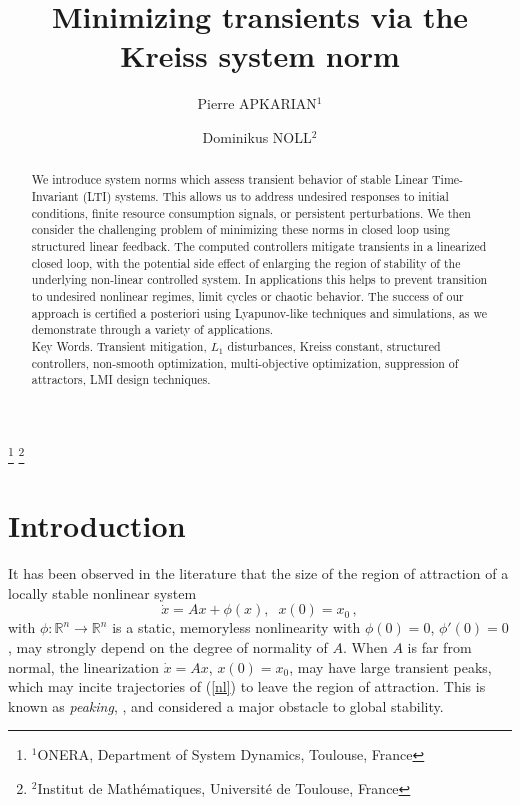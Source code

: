 \documentclass[12pt, a4paper,reqno]{amsart}
\theoremstyle{definition}
\begin{document}

\title[Kreiss system norm]{Minimizing transients via the Kreiss system  norm}
\author{Pierre APKARIAN$^1$}
\author{Dominikus NOLL$^{2}$}
\thanks{$^1$ONERA, Department of System Dynamics, Toulouse, France}
\thanks{$^2$Institut de Math\'ematiques, Universit\'e de Toulouse, France}



\begin{abstract}
We introduce system norms 
which assess transient behavior of stable Linear Time-Invariant (LTI) systems. 
This allows us to address undesired responses to initial conditions, finite resource consumption signals, or persistent perturbations.  
We then consider the challenging problem  of minimizing these norms in closed loop
using structured linear feedback. The computed controllers mitigate transients in a linearized
closed loop, with the potential side effect of enlarging the region of stability of the underlying 
non-linear controlled system. In applications this helps to
prevent transition to undesired nonlinear regimes, limit cycles or chaotic behavior. 
The success of our approach is certified a posteriori using Lyapunov-like techniques and simulations, 
as we demonstrate through a variety of applications.\\[0.5cm]


\noindent
{\sc Key Words.}  Transient mitigation,  $L_1$ disturbances, Kreiss constant, structured controllers, 
non-smooth optimization, multi-objective optimization, suppression of attractors, LMI design techniques.

\end{abstract} 

\maketitle



\section{Introduction}
It has been observed in the literature that the size of the region of attraction of 
a locally stable nonlinear system
\begin{equation}
\label{nl}
\dot{x} = Ax + \phi(x), \;\; x(0) = x_0\,,
\end{equation}
with $\phi : \mathbb{R}^n \to \mathbb{R}^n$ is a static, memoryless nonlinearity with $\phi(0)=0$, $\phi'(0)=0$, 
may strongly depend on the degree of normality of $A$.  When $A$ is far from normal, the linearization
$\dot{x}=Ax$, $x(0)=x_0$,
may have large transient peaks,  which may incite
trajectories of (\ref{nl}) to leave the region of attraction. This is known as {\it peaking}, 
\cite{sussmann1991peaking,francis1978bounded,lin2022co,Taira2017AIAA_Overview,Taira2019AIAA_Applications},
and considered a major obstacle to global stability. 
\end{document}
